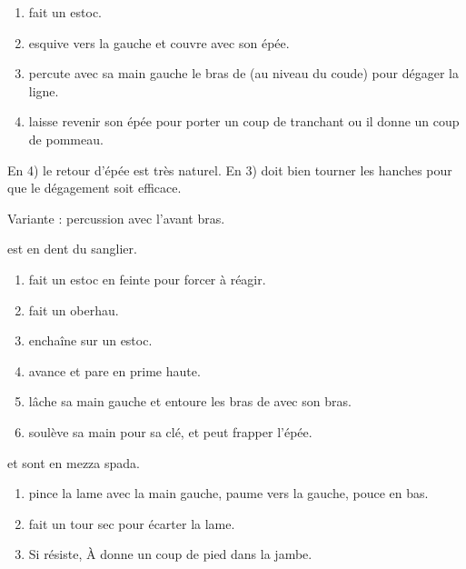 \begin{technique}

\begin{enumerate}
	\item \A fait un estoc.
	\item \D esquive vers la gauche et couvre avec son épée.
	\item \D percute avec sa main gauche le bras de \A (au niveau du coude) pour dégager la ligne.
	\item \D laisse revenir son épée pour porter un coup de tranchant ou il donne un coup de pommeau.
\end{enumerate}

En 4) le retour d'épée est très naturel.
En 3) \A doit bien tourner les hanches pour que le dégagement soit efficace.

Variante : percussion avec l'avant bras.
\end{technique}


\begin{technique}

\A est en dent du sanglier.

\begin{enumerate}
	\item \A fait un estoc en feinte pour forcer \D à réagir.
	\item \D fait un oberhau.
	\item \D enchaîne sur un estoc.
	\item \A avance et pare en prime haute.
	\item \A lâche sa main gauche et entoure les bras de \D avec son bras.
	\item \A soulève sa main pour sa clé, et peut frapper l'épée.
\end{enumerate}
\end{technique}


\begin{technique}

\A et \D sont en mezza spada.

\begin{enumerate}
	\item \A pince la lame avec la main gauche, paume vers la gauche, pouce en bas.
	\item \A fait un tour sec pour écarter la lame.
	\item Si \D résiste, À donne un coup de pied dans la jambe.
\end{enumerate}
\end{technique}


